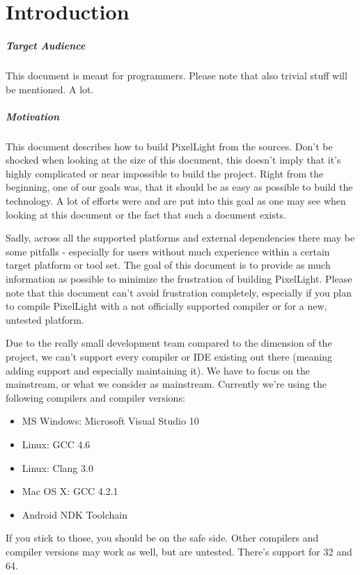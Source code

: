 \chapter{Introduction}


\paragraph{Target Audience}
This document is meant for programmers. Please note that also trivial stuff will be mentioned. A lot.


\paragraph{Motivation}
This document describes how to build PixelLight from the sources. Don't be shocked when looking at the size of this document, this doesn't imply that it's highly complicated or near impossible to build the project. Right from the beginning, one of our goals was, that it should be as easy as possible to build the technology. A lot of efforts were and are put into this goal as one may see when looking at this document or the fact that such a document exists.

Sadly, across all the supported platforms and external dependencies there may be some pitfalls - especially for users without much experience within a certain target platform or tool set. The goal of this document is to provide as much information as possible to minimize the frustration of building PixelLight. Please note that this document can't avoid frustration completely, especially if you plan to compile PixelLight with a not officially supported compiler or for a new, untested platform.

Due to the really small development team compared to the dimension of the project, we can't support every compiler or \ac{IDE} existing out there (meaning adding support and especially maintaining it). We have to focus on the mainstream, or what we consider as mainstream. Currently we're using the following compilers and compiler versions:
\begin{itemize}
\item{\ac{MS} Windows: Microsoft Visual Studio 10}
\item{Linux: \ac{GCC} 4.6}
\item{Linux: Clang 3.0}
\item{Mac OS X: \ac{GCC} 4.2.1}
\item{Android \ac{NDK} Toolchain}
\end{itemize}
If you stick to those, you should be on the safe side. Other compilers and compiler versions may work as well, but are untested. There's support for \SI{32}{\bit} and \SI{64}{\bit}.

